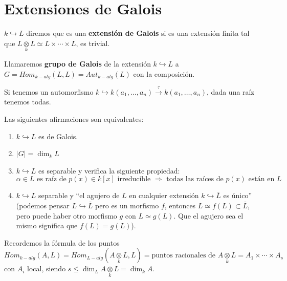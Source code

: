 \chapter{Extensiones de Galois}
\justifying
\begin{defi}
    $k \hookrightarrow L$ diremos que es una \textbf{extensi\'on de Galois} si es una extensi\'on finita tal que $L\underset{k}{\otimes} L \simeq L \times \cdots \times L$, es trivial. 
\end{defi}
\begin{defi}
    Llamaremos \textbf{grupo de Galois} de la extensi\'on $k \hookrightarrow L$ a $G = Hom_{k-alg}(L,L) = Aut_{k-alg}(L)$ con la composici\'on. 
\end{defi}
\begin{obs}
    Si tenemos un automorfismo $k \hookrightarrow k(a_1,\ldots, a_n) \overset{\tau}{\longrightarrow} k(a_1,\ldots, a_n)$, dada una ra\'iz tenemos todas.
\end{obs}
\begin{teo}
    Las siguientes afirmaciones son equivalentes:
    \begin{enumerate}[$a)$]
        \item $k \hookrightarrow L$ es de Galois.
        \item $|G|=\dim_k L$
        \item $k \hookrightarrow L$ es separable y verifica la siguiente propiedad:
        $$\alpha \in L \text{ es ra\'iz de } p(x)\in k[x] \text{ irreducible } \Rightarrow \text{ todas las ra\'ices de } p(x) \text{ est\'an en } L $$
        \item $k \hookrightarrow L$ separable y ``el agujero de $L$ en cualquier extensi\'on $k \hookrightarrow \bar L$ es \'unico'' (podemos pensar $L\hookrightarrow \bar L$ pero es un morfismo $f$, entonces $L \simeq f(L) \subset \bar L$, pero puede haber otro morfismo $g$ con $L\simeq g(L)$. Que el agujero sea el mismo significa que $f(L) = g(L)$). 
     \end{enumerate}
\end{teo}
\begin{lem}
    Recordemos la f\'ormula de los puntos
    $$Hom_{k-alg}(A,L) = Hom_{L-alg}(A\underset{k}{\otimes}L, L) = \text{puntos racionales de } A\underset{k}{\otimes}L = A_1 \times \cdots \times A_s $$
    con $A_i$ local, siendo $s\le \dim_L A\underset{k}{\otimes}L = \dim_k A$. 
\end{lem}
